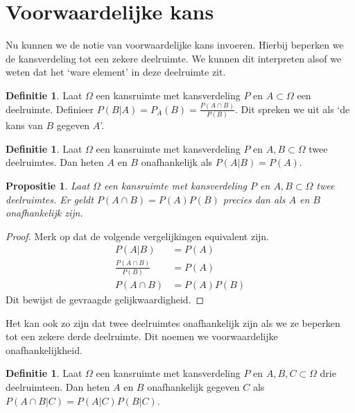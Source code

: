 \documentclass[a4paper]{report}
\newtheorem{proposition}[theorem]{Propositie}
\theoremstyle{definition}
\newtheorem{definition}[theorem]{Definitie}
\begin{document}
\section{Voorwaardelijke kans}
Nu kunnen we de notie van voorwaardelijke kans invoeren.
Hierbij beperken we de kansverdeling tot een zekere deelruimte.
We kunnen dit interpreten alsof we weten dat het `ware element' in deze deelruimte zit.
\begin{definition}
    Laat $\Omega$ een kansruimte met kansverdeling $P$ en $A \subset \Omega$ een deelruimte.
    Definieer $P(B|A) = P_A(B) = \frac{P(A \cap B)}{P(B)}$. Dit spreken we uit als `de kans van $B$ gegeven $A$'.
\end{definition}

\begin{definition}
    Laat $\Omega$ een kansruimte met kansverdeling $P$ en $A,B \subset \Omega$ twee deelruimtes.
    Dan heten $A$ en $B$ onafhankelijk als $P(A|B) = P(A)$.
\end{definition}

\begin{proposition}
    Laat $\Omega$ een kansruimte met kansverdeling $P$ en $A,B \subset \Omega$ twee deelruimtes.
    Er geldt $P(A \cap B) = P(A)P(B)$ precies dan als $A$ en $B$ onafhankelijk zijn.
\end{proposition}
\begin{proof}
    Merk op dat de volgende vergelijkingen equivalent zijn.
    \begin{align*}
        P(A|B)                      &= P(A) \\
        \frac{P(A \cap B)}{P(B)}    &= P(A) \\
        P(A \cap B)                 &= P(A)P(B)
    \end{align*}
    Dit bewijst de gevraagde gelijkwaardigheid.
\end{proof}

Het kan ook zo zijn dat twee deelruimtes onafhankelijk zijn als we ze beperken tot een zekere derde deelruimte.
Dit noemen we voorwaardelijke onafhankelijkheid.
\begin{definition}
    Laat $\Omega$ een kansruimte met kansverdeling $P$ en $A,B,C \subset \Omega$ drie deelruimteen.
    Dan heten $A$ en $B$ onafhankelijk gegeven $C$ als $P(A \cap B|C) = P(A|C)P(B|C)$.
\end{definition}
\end{document}
